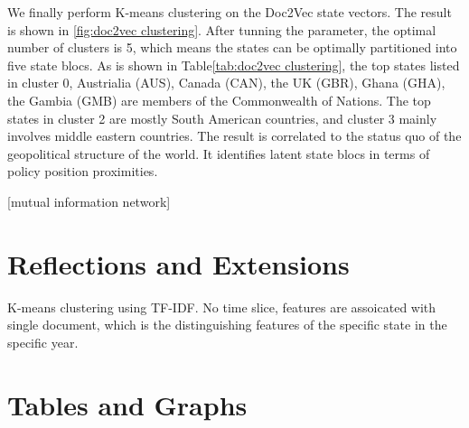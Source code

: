 \documentclass[final,authoryear,3p,12pt,times,hidelinks]{elsarticle}
\begin{document}
We finally perform K-means clustering on the Doc2Vec state vectors. The result is shown in \ref{fig:doc2vec clustering}. After tunning the parameter, the optimal number of clusters is 5, which means the states can be optimally partitioned into five state blocs. As is shown in Table\ref{tab:doc2vec clustering}, the top states listed in cluster 0, Austrialia (AUS), Canada (CAN), the UK (GBR), Ghana (GHA), the Gambia (GMB) are members of the Commonwealth of Nations. The top states in cluster 2 are mostly South American countries, and cluster 3 mainly involves middle eastern countries. The result is correlated to the status quo of the geopolitical structure of the world. It identifies latent state blocs in terms of policy position proximities. 

[mutual information network]

\section{Reflections and Extensions}
\label{sec:Reflections and Extensions}

K-means clustering using TF-IDF. No time slice, features are assoicated with single document, which is the distinguishing features of the specific state in the specific year. 




\pagebreak
\appendix
\section{Tables and Graphs}


\begin{landscape}
  
\end{landscape}
\end{document}
